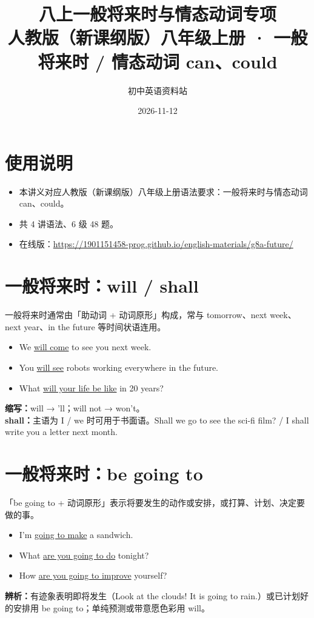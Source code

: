 \documentclass[11pt,a4paper]{ctexart}
\title{\textbf{八上一般将来时与情态动词专项}\\[4pt]
\large 人教版（新课纲版）八年级上册 · 一般将来时 / 情态动词 can、could}
\author{初中英语资料站}
\date{2026-11-12}
\begin{document}
\maketitle

\section*{使用说明}
\begin{itemize}[leftmargin=1.4em]
\item 本讲义对应人教版（新课纲版）八年级上册语法要求：一般将来时与情态动词 can、could。
\item 共 4 讲语法、6 级 48 题。
\item 在线版：\url{https://1901151458-prog.github.io/english-materials/g8a-future/}
\end{itemize}

\section{一般将来时：will / shall}
一般将来时通常由「助动词 + 动词原形」构成，常与 tomorrow、next week、next year、in the future 等时间状语连用。
\begin{itemize}[leftmargin=1.4em]
\item We \underline{will come} to see you next week.
\item You \underline{will see} robots working everywhere in the future.
\item What \underline{will your life be like} in 20 years?
\end{itemize}
\textbf{缩写：}will → 'll；will not → won't。\\
\textbf{shall：}主语为 I / we 时可用于书面语。Shall we go to see the sci-fi film? / I shall write you a letter next month.

\section{一般将来时：be going to}
「be going to + 动词原形」表示将要发生的动作或安排，或打算、计划、决定要做的事。
\begin{itemize}[leftmargin=1.4em]
\item I'm \underline{going to make} a sandwich.
\item What \underline{are you going to do} tonight?
\item How \underline{are you going to improve} yourself?
\end{itemize}
\textbf{辨析：}有迹象表明即将发生（Look at the clouds! It is going to rain.）或已计划好的安排用 be going to；单纯预测或带意愿色彩用 will。
\end{document}
